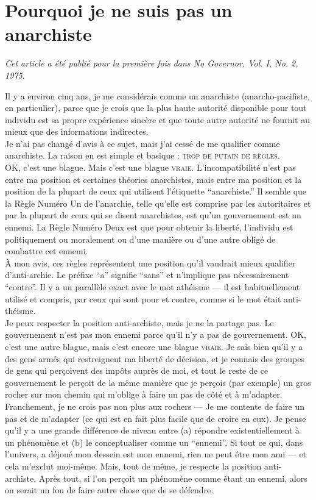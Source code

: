 \chapter{Pourquoi je ne suis pas un anarchiste}

\emph{Cet article a été publié pour la première fois dans No Governor, Vol. I, No. 2, 1975.\\}

Il y a environ cinq ans, je me considérais comme un anarchiste (anarcho-pacifiste, en particulier), parce que je crois que la plus haute autorité disponible pour tout individu est sa propre expérience sincère et que toute autre autorité ne fournit au mieux que des informations indirectes.\\
Je n'ai pas changé d'avis à ce sujet, mais j'ai cessé de me qualifier comme anarchiste. La raison en est simple et basique : \textsc{trop de putain de règles}.\\
OK, c'est une blague. Mais c'est une blague \textsc{vraie}. L'incompatibilité n'est pas entre ma position et certaines théories anarchistes, mais entre ma position et la position de la plupart de ceux qui utilisent l'étiquette ``anarchiste.''
Il semble que la Règle Numéro Un de l'anarchie, telle qu'elle est comprise par les autoritaires et par la plupart de ceux qui se disent anarchistes, est qu'un gouvernement est un ennemi. La Règle Numéro Deux est que pour obtenir la liberté, l'individu est politiquement ou moralement ou d'une manière ou d'une autre obligé de combattre cet ennemi.\\
À mon avis, ces règles représentent une position qu'il vaudrait mieux qualifier d'anti-archie. Le préfixe ``a'' signifie ``sans'' et n'implique pas nécessairement ``contre''. Il y a un parallèle exact avec le mot athéisme --- il est habituellement utilisé et compris, par ceux qui sont pour et contre, comme si le mot était anti-théisme.\\
Je peux respecter la position anti-archiste, mais je ne la partage pas. Le gouvernement n'est pas mon ennemi parce qu'il n'y a pas de gouvernement. OK, c'est une autre blague, mais c'est encore une blague \textsc{vraie}. Je sais bien qu'il y a des gens armés qui restreignent ma liberté de décision, et je connais des groupes de gens qui perçoivent des impôts auprès de moi, et tout le reste de ce gouvernement le perçoit de la même manière que je perçois (par exemple) un gros rocher sur mon chemin qui m'oblige à faire un pas de côté et à m'adapter. Franchement, je ne crois pas non plus aux rochers --- Je me contente de faire un pas et de m'adapter (ce qui est en fait plus facile que de croire en eux). Je pense qu'il y a une grande différence de niveau entre (a) répondre existentiellement à un phénomène et (b) le conceptualiser comme un ``ennemi''. Si tout ce qui, dans l'univers, a déjoué mon dessein est mon ennemi, rien ne peut être mon ami --- et cela m'exclut moi-même. Mais, tout de même, je respecte la position anti-archiste. Après tout, si l'on perçoit un phénomène comme étant un ennemi, alors on serait un fou de faire autre chose que de se défendre.\\
